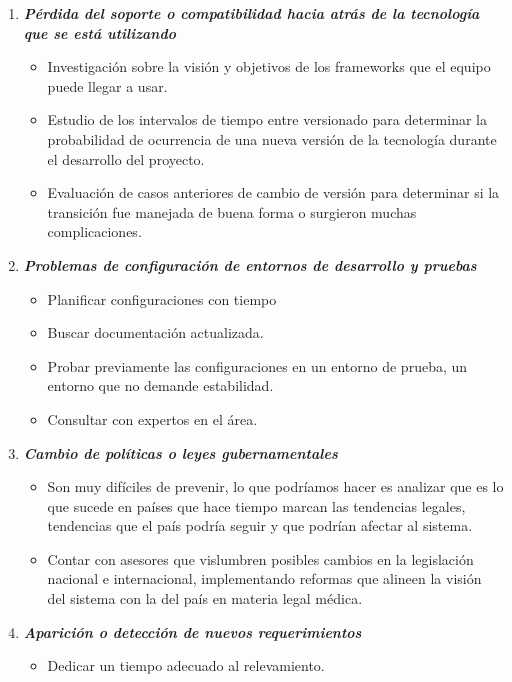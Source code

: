 \begin{enumerate}
\begin{itemize}
			\end{itemize}
        \item \textbf{\textit{Pérdida del soporte o compatibilidad hacia atrás de la tecnología que se está utilizando}}
        	\begin{itemize}
				\item Investigación sobre la visión y objetivos de los frameworks que el equipo puede llegar a usar.
                \item Estudio de los intervalos de tiempo entre versionado para determinar la probabilidad de ocurrencia de una nueva versión de la tecnología durante el desarrollo del proyecto.
                \item Evaluación de casos anteriores de cambio de versión para determinar si la transición fue manejada de buena forma o surgieron muchas complicaciones.
			\end{itemize}
        \item \textbf{\textit{Problemas de configuración de entornos de desarrollo y pruebas}}
        	\begin{itemize}
				\item Planificar configuraciones con tiempo
                \item Buscar documentación actualizada.
                \item Probar previamente las configuraciones en un entorno de prueba, un entorno que no demande estabilidad.
                \item Consultar con expertos en el área.
			\end{itemize}
        \item \textbf{\textit{Cambio de políticas o leyes gubernamentales}}
        	\begin{itemize}
				\item Son muy difíciles de prevenir, lo que podríamos hacer es analizar que es lo que sucede en países que hace tiempo marcan las tendencias legales, tendencias que el país podría seguir y que podrían afectar al sistema.
                \item Contar con asesores que vislumbren posibles cambios en la legislación nacional e internacional, implementando reformas que alineen la visión del sistema con la del país en materia legal médica.
			\end{itemize}
        \item \textbf{\textit{Aparición o detección de nuevos requerimientos}}
        	\begin{itemize}
				\item Dedicar un tiempo adecuado al relevamiento.

\end{itemize}
\end{enumerate}
